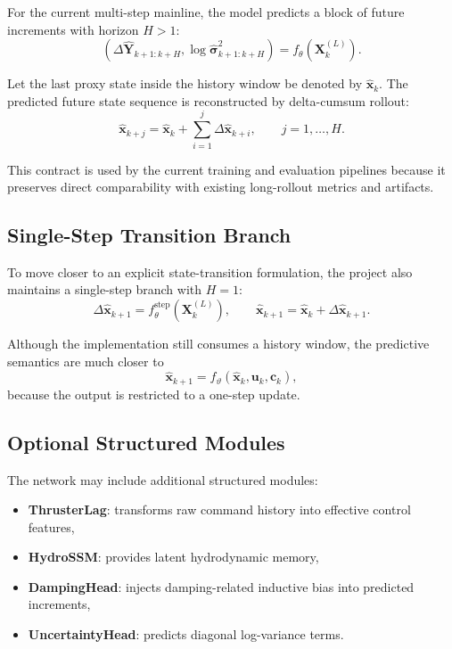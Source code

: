 For the current multi-step mainline, the model predicts a block of future increments with horizon $H>1$:
\begin{equation}
\left(
\Delta \hat{\mathbf{Y}}_{k+1:k+H},
\log \hat{\boldsymbol{\sigma}}^2_{k+1:k+H}
\right)
=
f_{\theta}\!\left(\mathbf{X}^{(L)}_k\right).
\end{equation}

Let the last proxy state inside the history window be denoted by $\hat{\mathbf{x}}_k$.
The predicted future state sequence is reconstructed by delta-cumsum rollout:
\begin{equation}
\hat{\mathbf{x}}_{k+j}
=
\hat{\mathbf{x}}_{k}
+
\sum_{i=1}^{j}\Delta \hat{\mathbf{x}}_{k+i},
\qquad j = 1,\dots,H.
\end{equation}

This contract is used by the current training and evaluation pipelines because it preserves direct comparability with existing long-rollout metrics and artifacts.

\subsection{Single-Step Transition Branch}

To move closer to an explicit state-transition formulation, the project also maintains a single-step branch with $H=1$:
\begin{equation}
\Delta \hat{\mathbf{x}}_{k+1}
=
f_{\theta}^{\mathrm{step}}\!\left(\mathbf{X}^{(L)}_k\right),
\qquad
\hat{\mathbf{x}}_{k+1}
=
\hat{\mathbf{x}}_{k} + \Delta \hat{\mathbf{x}}_{k+1}.
\end{equation}

Although the implementation still consumes a history window, the predictive semantics are much closer to
\begin{equation}
\hat{\mathbf{x}}_{k+1} = f_{\vartheta}\!\left(\hat{\mathbf{x}}_{k}, \mathbf{u}_{k}, \mathbf{c}_{k}\right),
\end{equation}
because the output is restricted to a one-step update.

\subsection{Optional Structured Modules}

The network may include additional structured modules:
\begin{itemize}
  \item \textbf{ThrusterLag}: transforms raw command history into effective control features,
  \item \textbf{HydroSSM}: provides latent hydrodynamic memory,
  \item \textbf{DampingHead}: injects damping-related inductive bias into predicted increments,
  \item \textbf{UncertaintyHead}: predicts diagonal log-variance terms.
\end{itemize}

